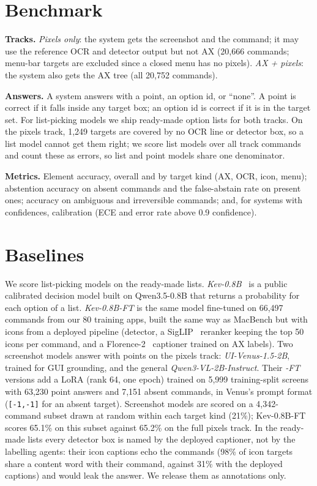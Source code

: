 \documentclass[sigconf,screen,review]{acmart}
\newcommand{\bench}{MacBench}
\begin{document}
\section{Benchmark}
\textbf{Tracks.} \emph{Pixels only}: the system gets the screenshot and the command; it may use the reference OCR and detector output but not AX (20,666 commands; menu-bar targets are excluded since a closed menu has no pixels). \emph{AX + pixels}: the system also gets the AX tree (all 20,752 commands).

\textbf{Answers.} A system answers with a point, an option id, or ``none''. A point is correct if it falls inside any target box; an option id is correct if it is in the target set. For list-picking models we ship ready-made option lists for both tracks. On the pixels track, 1,249 targets are covered by no OCR line or detector box, so a list model cannot get them right; we score list models over all track commands and count these as errors, so list and point models share one denominator.

\textbf{Metrics.} Element accuracy, overall and by target kind (AX, OCR, icon, menu); abstention accuracy on absent commands and the false-abstain rate on present ones; accuracy on ambiguous and irreversible commands; and, for systems with confidences, calibration (ECE and error rate above 0.9 confidence).

\section{Baselines}
We score list-picking models on the ready-made lists. \emph{Kev-0.8B}~\cite{kev} is a public calibrated decision model built on Qwen3.5-0.8B that returns a probability for each option of a list. \emph{Kev-0.8B-FT} is the same model fine-tuned on 66,497 commands from our 80 training apps, built the same way as \bench{} but with icons from a deployed pipeline (detector, a SigLIP~\cite{siglip} reranker keeping the top 50 icons per command, and a Florence-2~\cite{florence2} captioner trained on AX labels). Two screenshot models answer with points on the pixels track: \emph{UI-Venus-1.5-2B}, trained for GUI grounding, and the general \emph{Qwen3-VL-2B-Instruct}. Their \emph{-FT} versions add a LoRA (rank 64, one epoch) trained on 5,999 training-split screens with 63,230 point answers and 7,151 absent commands, in Venus's prompt format (\texttt{[-1,-1]} for an absent target). Screenshot models are scored on a 4,342-command subset drawn at random within each target kind (21\%); Kev-0.8B-FT scores 65.1\% on this subset against 65.2\% on the full pixels track. In the ready-made lists every detector box is named by the deployed captioner, not by the labelling agents: their icon captions echo the commands (98\% of icon targets share a content word with their command, against 31\% with the deployed captions) and would leak the answer. We release them as annotations only.
\end{document}
